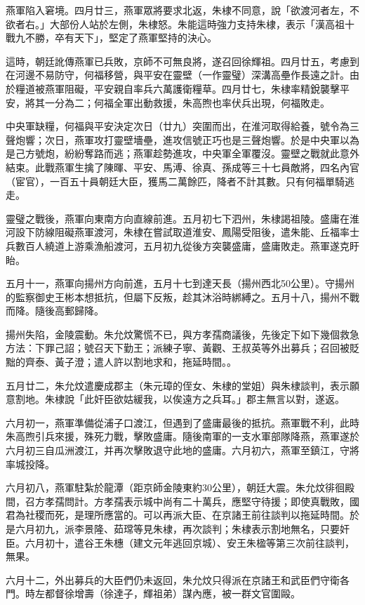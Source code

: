 燕軍陷入窘境。四月廿三，燕軍眾將要求北返，朱棣不同意，說「欲渡河者左，不欲者右。」大部份人站於左側，朱棣怒。朱能這時強力支持朱棣，表示「漢高祖十戰九不勝，卒有天下」，堅定了燕軍堅持的決心。

這時，朝廷訛傳燕軍已兵敗，京師不可無良將，遂召回徐輝祖。四月廿五，考慮到在河邊不易防守，何福移營，與平安在靈壁（一作靈璧）深溝高壘作長遠之計。由於糧道被燕軍阻礙，平安親自率兵六萬護衛糧草。四月廿七，朱棣率精銳襲擊平安，將其一分為二；何福全軍出動救援，朱高煦也率伏兵出現，何福敗走。

中央軍缺糧，何福與平安決定次日（廿九）突圍而出，在淮河取得給養，號令為三聲炮響；次日，燕軍攻打靈壁墻壘，進攻信號正巧也是三聲炮響。於是中央軍以為是己方號炮，紛紛奪路而逃；燕軍趁勢進攻，中央軍全軍覆沒。靈壁之戰就此意外結束。此戰燕軍生擒了陳暉、平安、馬溥、徐真、孫成等三十七員敵將，四名內官（宦官），一百五十員朝廷大臣，獲馬二萬餘匹，降者不計其數。只有何福單騎逃走。

靈璧之戰後，燕軍向東南方向直線前進。五月初七下泗州，朱棣謁祖陵。盛庸在淮河設下防線阻礙燕軍渡河，朱棣在嘗試取道淮安、鳳陽受阻後，遣朱能、丘福率士兵數百人繞道上游乘漁船渡河，五月初九從後方突襲盛庸，盛庸敗走。燕軍遂克盱眙。

五月十一，燕軍向揚州方向前進，五月十七到達天長（揚州西北50公里）。守揚州的監察御史王彬本想抵抗，但屬下反叛，趁其沐浴時綁縛之。五月十八，揚州不戰而降。隨後高郵歸降。

揚州失陷，金陵震動。朱允炆驚慌不已，與方孝孺商議後，先後定下如下幾個救急方法：下罪己詔；號召天下勤王；派練子寧、黃觀、王叔英等外出募兵；召回被貶黜的齊泰、黃子澄；遣人許以割地求和，拖延時間。。

五月廿二，朱允炆遣慶成郡主（朱元璋的侄女、朱棣的堂姐）與朱棣談判，表示願意割地。朱棣說「此奸臣欲姑緩我，以俟遠方之兵耳。」郡主無言以對，遂返。

六月初一，燕軍準備從浦子口渡江，但遇到了盛庸最後的抵抗。燕軍戰不利，此時朱高煦引兵來援，殊死力戰，擊敗盛庸。隨後南軍的一支水軍部隊降燕，燕軍遂於六月初三自瓜洲渡江，并再次擊敗退守此地的盛庸。六月初六，燕軍至鎮江，守將率城投降。

六月初八，燕軍駐紮於龍潭（距京師金陵東約30公里），朝廷大震。朱允炆徘徊殿間，召方孝孺問計。方孝孺表示城中尚有二十萬兵，應堅守待援；即使真戰敗，國君為社稷而死，是理所應當的。可以再派大臣、在京諸王前往談判以拖延時間。於是六月初九，派李景隆、茹瑺等見朱棣，再次談判；朱棣表示割地無名，只要奸臣。六月初十，遣谷王朱橞（建文元年逃回京城）、安王朱楹等第三次前往談判，無果。

六月十二，外出募兵的大臣們仍未返回，朱允炆只得派在京諸王和武臣們守衛各門。時左都督徐增壽（徐達子，輝祖弟）謀內應，被一群文官圍毆。


